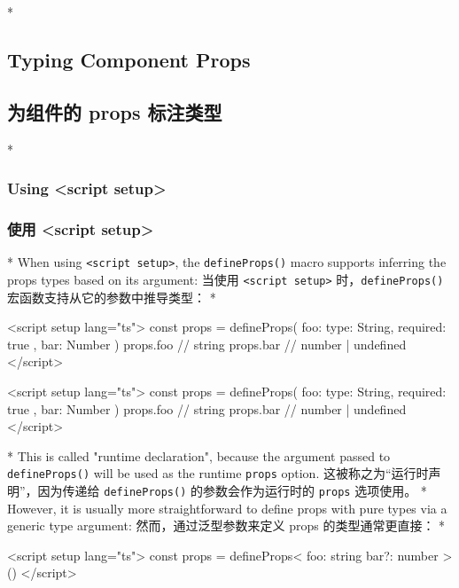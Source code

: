\begin{paracol}{2} 
 
\switchcolumn[0]*%
\subsection{Typing Component Props}
\switchcolumn
\subsection{为组件的 props 标注类型}
\switchcolumn[0]*%
\subsubsection{Using \textless script setup\textgreater{}}
\switchcolumn
\subsubsection{使用 \textless script setup\textgreater{}}
\switchcolumn[0]*%
When using \texttt{\textless{}script\ setup\textgreater{}}, the
\texttt{defineProps()} macro supports inferring the props types based on
its argument:
\switchcolumn
当使用 \texttt{\textless{}script\ setup\textgreater{}}
时，\texttt{defineProps()} 宏函数支持从它的参数中推导类型：
\switchcolumn[0]*%
\begin{codeHtml}
<script setup lang="ts">
const props = defineProps({
  foo: { type: String, required: true },
  bar: Number
})
props.foo // string
props.bar // number | undefined
</script>
\end{codeHtml}
\switchcolumn
\begin{codeHtml}
<script setup lang="ts">
const props = defineProps({
  foo: { type: String, required: true },
  bar: Number
})
props.foo // string
props.bar // number | undefined
</script>
\end{codeHtml}
\switchcolumn[0]*%
This is called "runtime declaration", because the argument passed to
\texttt{defineProps()} will be used as the runtime \texttt{props}
option.
\switchcolumn
这被称之为``运行时声明''，因为传递给 \texttt{defineProps()}
的参数会作为运行时的 \texttt{props} 选项使用。
\switchcolumn[0]*%
However, it is usually more straightforward to define props with pure
types via a generic type argument:
\switchcolumn
然而，通过泛型参数来定义 props 的类型通常更直接：
\switchcolumn[0]*%
\begin{codeHtml}
<script setup lang="ts">
const props = defineProps<{
  foo: string
  bar?: number
}>()
</script>

\end{codeHtml}
\end{paracol}
